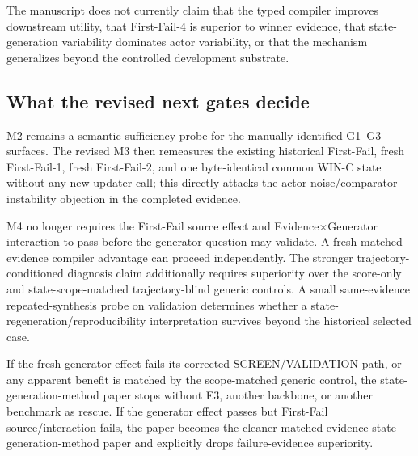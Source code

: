 The manuscript does not currently claim that the typed compiler improves downstream utility, that First-Fail-4 is superior to winner evidence, that state-generation variability dominates actor variability, or that the mechanism generalizes beyond the controlled development substrate.

\subsection{What the revised next gates decide}
M2 remains a semantic-sufficiency probe for the manually identified G1--G3 surfaces. The revised M3 then remeasures the existing historical First-Fail, fresh First-Fail-1, fresh First-Fail-2, and one byte-identical common WIN-C state without any new updater call; this directly attacks the actor-noise/comparator-instability objection in the completed evidence.

M4 no longer requires the First-Fail source effect and Evidence$\times$Generator interaction to pass before the generator question may validate. A fresh matched-evidence compiler advantage can proceed independently. The stronger trajectory-conditioned diagnosis claim additionally requires superiority over the score-only and state-scope-matched trajectory-blind generic controls. A small same-evidence repeated-synthesis probe on validation determines whether a state-regeneration/reproducibility interpretation survives beyond the historical selected case.

If the fresh generator effect fails its corrected SCREEN/VALIDATION path, or any apparent benefit is matched by the scope-matched generic control, the state-generation-method paper stops without E3, another backbone, or another benchmark as rescue. If the generator effect passes but First-Fail source/interaction fails, the paper becomes the cleaner matched-evidence state-generation-method paper and explicitly drops failure-evidence superiority.

